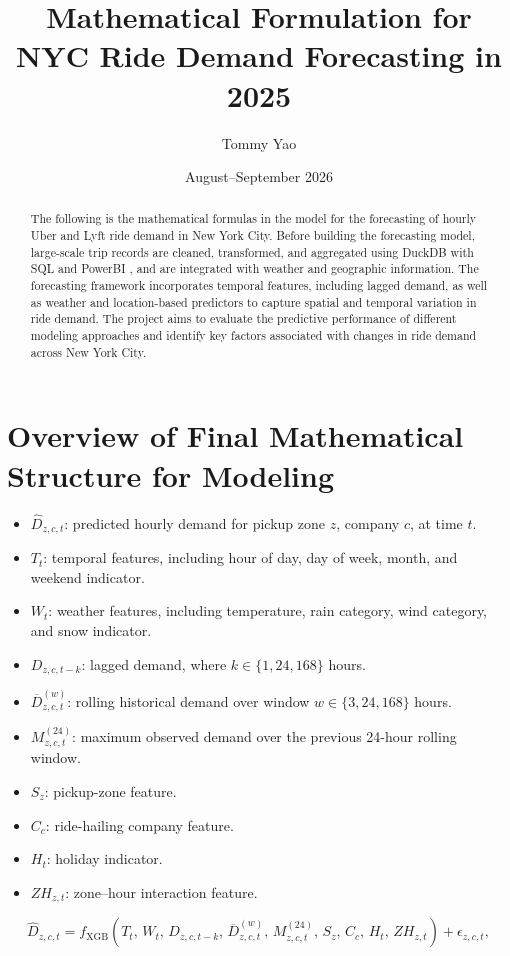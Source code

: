 \documentclass{article}
\title{Mathematical Formulation for NYC Ride Demand Forecasting in 2025}
\author{Tommy Yao}
\date{August--September 2026}
\begin{document}
\maketitle

\begin{abstract}
The following is the mathematical formulas in the model for the forecasting of  hourly Uber and Lyft ride demand in New York City. 
Before building the forecasting model, large-scale trip records are cleaned, transformed, and aggregated using 
DuckDB with SQL and PowerBI , and are integrated with weather and geographic information. 
The forecasting framework incorporates temporal features, including lagged demand, 
as well as weather and location-based predictors to capture spatial and temporal 
variation in ride demand. The project aims to evaluate the predictive performance 
of different modeling approaches and identify key factors associated with changes 
in ride demand across New York City.

\end{abstract}
\section{Overview of Final Mathematical Structure for Modeling}
\begin{itemize}
    \item $\widehat{D}_{z,c,t}$: predicted hourly demand for pickup zone $z$,
    company $c$, at time $t$.
    
    \item $T_t$: temporal features, including hour of day,
    day of week, month, and weekend indicator.
    
    \item $W_t$: weather features, including temperature,
    rain category, wind category, and snow indicator.
    
    \item $D_{z,c,t-k}$: lagged demand, where
    $k \in \{1,24,168\}$ hours.
    
    \item $\overline{D}_{z,c,t}^{(w)}$: rolling historical demand
    over window $w \in \{3,24,168\}$ hours.
    
    \item $M_{z,c,t}^{(24)}$: maximum observed demand over the
    previous 24-hour rolling window.
    
    \item $S_z$: pickup-zone feature.
    
    \item $C_c$: ride-hailing company feature.
    
    \item $H_t$: holiday indicator.
    
    \item $ZH_{z,t}$: zone--hour interaction feature.
\end{itemize}
\begin{equation}
\widehat{D}_{z,c,t}
=
f_{\mathrm{XGB}}
\left(
T_t,\,
W_t,\,
D_{z,c,t-k},\,
\overline{D}_{z,c,t}^{(w)},\,
M_{z,c,t}^{(24)},\,
S_z,\,
C_c,\,
H_t,\,
Z\!H_{z,t}
\right)+\epsilon_{z,c,t},
\end{equation}
\end{document}

